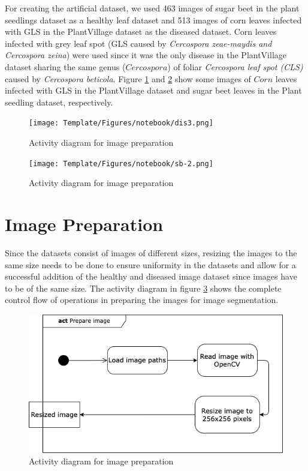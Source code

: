 For creating the artificial dataset, we used 463 images of sugar beet in the plant seedlings dataset as a healthy leaf dataset and 513 images of corn leaves infected with GLS in the PlantVillage dataset as the diseased dataset.
Corn leaves infected with grey leaf spot (GLS caused by \textit{Cercospora zeae-maydis and Cercospora zeina}) were used since it was the only disease in the PlantVillage dataset sharing the same genus ($Cercospora$) of foliar \textit{Cercospora leaf spot (CLS)} caused by \textit{Cercospora beticola}. Figure \ref{fig:my_dis3} and \ref{fig:my_sb_2} show some images of $Corn$ leaves infected with GLS in the PlantVillage dataset and sugar beet leaves in the Plant seedling dataset, respectively. 


\begin{figure}[!htb]
    \centering
    \texttt{[image: Template/Figures/notebook/dis3.png]}
    \caption{Activity diagram for image preparation}
    \label{fig:my_dis3}
\end{figure}

\begin{figure}[!htb]
    \centering
    \texttt{[image: Template/Figures/notebook/sb-2.png]}
    \caption{Activity diagram for image preparation}
    \label{fig:my_sb_2}
\end{figure}


\section{Image Preparation}
Since the datasets consist of images of different sizes, resizing the images to the same size needs to be done to ensure uniformity in the datasets and allow for a successful addition of the healthy and diseased image dataset since images have to be of the same size. The activity diagram in figure \ref{fig:my_act1} shows the complete control flow of operations in preparing the images for image segmentation.  


\begin{figure}[!htb]
    \centering
    \includegraphics[scale=0.75, keepaspectratio]{Figures/act1.png}
    \caption{Activity diagram for image preparation}
    \label{fig:my_act1}
\end{figure}

